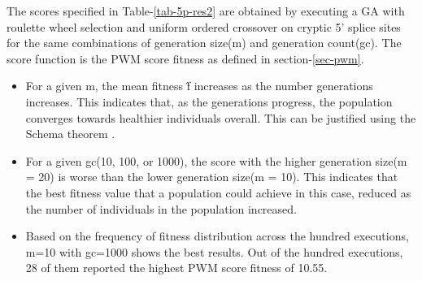 The scores specified in Table-\ref{tab-5p-res2} are obtained by executing a GA with roulette wheel selection and uniform ordered crossover on cryptic 5' splice sites for the same combinations of generation size(m) and generation count(gc). The score function is the PWM score fitness as defined in section-\ref{sec-pwm}.
\begin{itemize}
	\item For a given m, the mean fitness \^{f} increases as the number generations increases. This indicates that, as the generations progress, the population converges towards healthier individuals overall. This can be justified using the Schema theorem \cite{khuri2}.
	\item For a given gc(10, 100, or 1000), the score with the higher generation size(m = 20) is worse than the lower generation size(m = 10). This indicates that the best fitness value that a population could achieve in this case, reduced as the number of individuals in the population increased.
	\item Based on the frequency of fitness distribution across the hundred executions, m=10 with gc=1000 shows the best results. Out of the hundred executions, 28 of them reported the highest PWM score fitness of 10.55.
\end{itemize}

